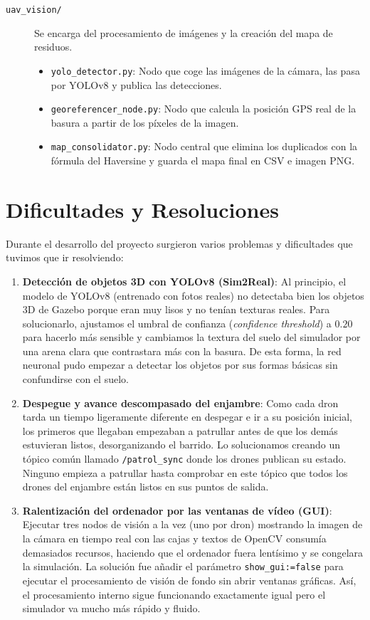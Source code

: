 \documentclass[11pt,a4paper]{article}
\begin{document}
\begin{description}
    \item[\texttt{uav\_vision/}] Se encarga del procesamiento de imágenes y la creación del mapa de residuos.
    \begin{itemize}
        \item \texttt{yolo\_detector.py}: Nodo que coge las imágenes de la cámara, las pasa por YOLOv8 y publica las detecciones.
        \item \texttt{georeferencer\_node.py}: Nodo que calcula la posición GPS real de la basura a partir de los píxeles de la imagen.
        \item \texttt{map\_consolidator.py}: Nodo central que elimina los duplicados con la fórmula del Haversine y guarda el mapa final en CSV e imagen PNG.
    \end{itemize}
\end{description}

\section{Dificultades y Resoluciones}
Durante el desarrollo del proyecto surgieron varios problemas y dificultades que tuvimos que ir resolviendo:

\begin{enumerate}
    \item \textbf{Detección de objetos 3D con YOLOv8 (Sim2Real)}: Al principio, el modelo de YOLOv8 (entrenado con fotos reales) no detectaba bien los objetos 3D de Gazebo porque eran muy lisos y no tenían texturas reales. Para solucionarlo, ajustamos el umbral de confianza (\textit{confidence threshold}) a $0.20$ para hacerlo más sensible y cambiamos la textura del suelo del simulador por una arena clara que contrastara más con la basura. De esta forma, la red neuronal pudo empezar a detectar los objetos por sus formas básicas sin confundirse con el suelo.

    \item \textbf{Despegue y avance descompasado del enjambre}: Como cada dron tarda un tiempo ligeramente diferente en despegar e ir a su posición inicial, los primeros que llegaban empezaban a patrullar antes de que los demás estuvieran listos, desorganizando el barrido. Lo solucionamos creando un tópico común llamado \texttt{/patrol\_sync} donde los drones publican su estado. Ninguno empieza a patrullar hasta comprobar en este tópico que todos los drones del enjambre están listos en sus puntos de salida.

    \item \textbf{Ralentización del ordenador por las ventanas de vídeo (GUI)}: Ejecutar tres nodos de visión a la vez (uno por dron) mostrando la imagen de la cámara en tiempo real con las cajas y textos de OpenCV consumía demasiados recursos, haciendo que el ordenador fuera lentísimo y se congelara la simulación. La solución fue añadir el parámetro \texttt{show\_gui:=false} para ejecutar el procesamiento de visión de fondo sin abrir ventanas gráficas. Así, el procesamiento interno sigue funcionando exactamente igual pero el simulador va mucho más rápido y fluido.
\end{enumerate}
\end{document}
